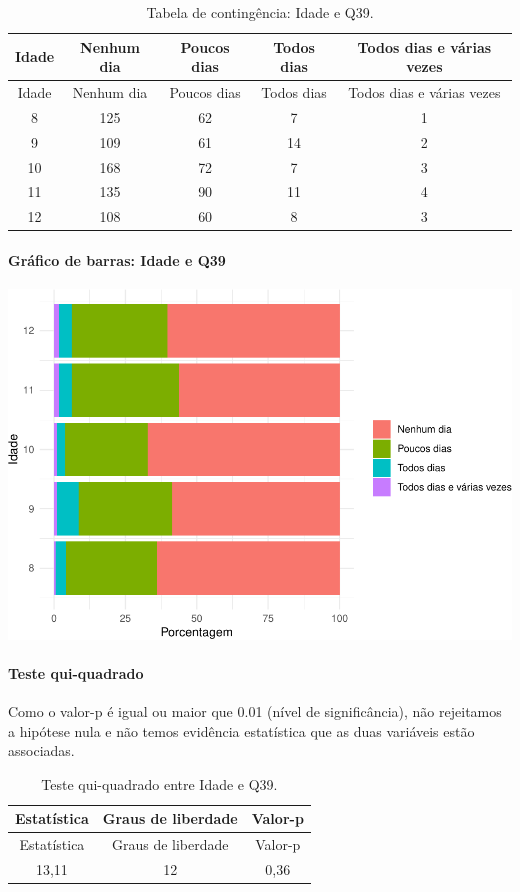 \documentclass[]{article}
\let\oldparagraph\paragraph
\renewcommand{\paragraph}[1]{\oldparagraph{#1}\mbox{}}
\begin{document}
\begin{longtable}[]{@{}ccccc@{}}
\caption{\label{tab:unnamed-chunk-1508}Tabela de contingência: Idade e Q39.}\tabularnewline
\toprule
Idade & Nenhum dia & Poucos dias & Todos dias & Todos dias e várias vezes\tabularnewline
\midrule
\endfirsthead
\toprule
Idade & Nenhum dia & Poucos dias & Todos dias & Todos dias e várias vezes\tabularnewline
\midrule
\endhead
8 & 125 & 62 & 7 & 1\tabularnewline
9 & 109 & 61 & 14 & 2\tabularnewline
10 & 168 & 72 & 7 & 3\tabularnewline
11 & 135 & 90 & 11 & 4\tabularnewline
12 & 108 & 60 & 8 & 3\tabularnewline
\bottomrule
\end{longtable}

\hypertarget{gruxe1fico-de-barras-idade-e-q39}{%
\paragraph{Gráfico de barras: Idade e Q39}\label{gruxe1fico-de-barras-idade-e-q39}}

\begin{center}\includegraphics[width=0.75\linewidth]{relatorio_covid19_files/figure-latex/unnamed-chunk-1509-1} \end{center}

\hypertarget{teste-qui-quadrado-129}{%
\paragraph{Teste qui-quadrado}\label{teste-qui-quadrado-129}}

Como o valor-p é igual ou maior que 0.01 (nível de significância), não rejeitamos a hipótese nula e não temos evidência estatística que as duas variáveis estão associadas.

\begin{longtable}[]{@{}ccc@{}}
\caption{\label{tab:unnamed-chunk-1511}Teste qui-quadrado entre Idade e Q39.}\tabularnewline
\toprule
Estatística & Graus de liberdade & Valor-p\tabularnewline
\midrule
\endfirsthead
\toprule
Estatística & Graus de liberdade & Valor-p\tabularnewline
\midrule
\endhead
13,11 & 12 & 0,36\tabularnewline
\bottomrule
\end{longtable}
\end{document}
